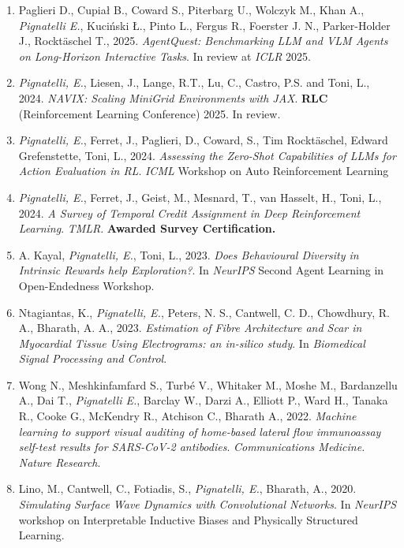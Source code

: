 \begin{publications}
    \begin{enumerate}[leftmargin=0.45cm, itemsep=0em, topsep=0.5em, parsep=0.2em]
        \item Paglieri D., Cupiał B., Coward S., Piterbarg U., Wolczyk M., Khan A., \emph{Pignatelli E.}, Kuciński Ł., Pinto L., Fergus R., Foerster J. N., Parker-Holder J., Rocktäschel T., 2025. \textit{AgentQuest: Benchmarking LLM and VLM Agents on Long-Horizon Interactive Tasks}. In review at \emph{ICLR} 2025.
        \item \emph{Pignatelli, E.}, Liesen, J., Lange, R.T., Lu, C., Castro, P.S. and Toni, L., 2024.\textit{ NAVIX: Scaling MiniGrid Environments with JAX}. \textbf{RLC} (Reinforcement Learning Conference) 2025. In review.
        \item \emph{Pignatelli, E.}, Ferret, J., Paglieri, D., Coward, S., Tim Rocktäschel, Edward Grefenstette, Toni, L., 2024. \textit{Assessing the Zero-Shot Capabilities of LLMs for Action Evaluation in RL}. \emph{ICML} Workshop on Auto Reinforcement Learning
        \item \emph{Pignatelli, E.}, Ferret, J., Geist, M., Mesnard, T., van Hasselt, H., Toni, L., 2024. \textit{A Survey of Temporal Credit Assignment in Deep Reinforcement Learning}. \emph{TMLR}. \textbf{Awarded Survey Certification.}
        \item A. Kayal, \emph{Pignatelli, E.}, Toni, L., 2023. \textit{Does Behavioural Diversity in Intrinsic Rewards help Exploration?}. In \emph{NeurIPS} Second Agent Learning in Open-Endedness Workshop.
        \item Ntagiantas, K., \emph{Pignatelli, E.}, Peters, N. S., Cantwell, C. D., Chowdhury, R. A., Bharath, A. A., 2023. \textit{Estimation of Fibre Architecture and Scar in Myocardial Tissue Using Electrograms: an in-silico study}. In \textit{Biomedical Signal Processing and Control}.
        \item Wong N., Meshkinfamfard S., Turbé V., Whitaker M., Moshe M., Bardanzellu A., Dai T., \emph{Pignatelli E.}, Barclay W., Darzi A., Elliott P., Ward H., Tanaka R., Cooke G., McKendry R., Atchison C., Bharath A., 2022. \textit{Machine learning to support visual auditing of home-based lateral flow immunoassay self-test results for SARS-CoV-2 antibodies}. \emph{Communications Medicine. Nature Research}.
        \item Lino, M., Cantwell, C., Fotiadis, S., \emph{Pignatelli, E.}, Bharath, A., 2020. \textit{Simulating Surface Wave Dynamics with Convolutional Networks}. In \emph{NeurIPS} workshop on Interpretable Inductive Biases and Physically Structured Learning.

\end{enumerate}
\end{publications}
